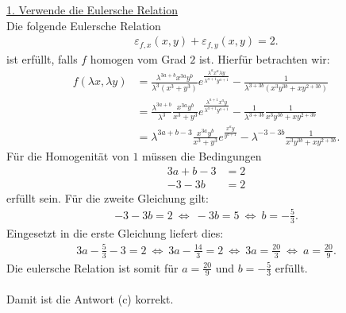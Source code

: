\underline{1. Verwende die Eulersche Relation}\\
Die folgende Eulersche Relation 
\begin{align*}
	\varepsilon_{f,x}(x,y) + \varepsilon_{f,y}(x,y) 
	= 2.
\end{align*}
ist erfüllt, falls $f$ homogen vom Grad $2$ ist. Hierfür betrachten wir:
\begin{align*}
	f(\lambda x , \lambda y)
	&=
	\frac{\lambda^{3a + b} x^{3a} y^b}{\lambda^3 (x^3 + y^3)}
	e^{\frac{\lambda^a x^a \lambda y}{\lambda^{a+1} y^{a+1}}}
	-
	\frac{1}{
		\lambda^{3 + 3b}
		(
		x^3 y^{3b} + x y^{2+ 3b}
		)
	}\\
	&= 
	\frac{\lambda^{3a + b}}{\lambda^3}
	\frac{x^{3a} y^b}{x^3 + y^3} 	e^{\frac{\lambda^{a+1} x^a  y}{\lambda^{a+1} y^{a+1}}}
	-
	\frac{1}{\lambda^{3 + 3b}}
	\frac{1}{
		x^3 y^{3b} + x y^{2+ 3b}
	}\\
	&= 
	\lambda^{3a + b -3 }
	\frac{x^{3a} y^b}{x^3 + y^3} 
	e^{\frac{ x^a  y}{ y^{a+1}}}
	-
	\lambda^{-3 - 3b}
	\frac{1}{
		x^3 y^{3b} + x y^{2+ 3b}
	}.
\end{align*}
Für die Homogenität von $1$ müssen die Bedingungen
\begin{align*}
	3a + b - 3 &= 2\\
	-3 - 3b &= 2
\end{align*}
erfüllt sein. Für die zweite Gleichung gilt:
\begin{align*}
	-3 -3 b = 2  
	\ \Leftrightarrow \
	-3 b = 5
	\ \Leftrightarrow \
	b = - \frac{5}{3}.
\end{align*}
Eingesetzt in die erste Gleichung liefert dies:
\begin{align*}
	3a - \frac{5}{3}  -3 = 2
	\ \Leftrightarrow \
	3a - \frac{14}{3}  = 2 
	\ \Leftrightarrow \
	3a = \frac{20}{3}
	\ \Leftrightarrow \
	a  = \frac{20}{9}.
\end{align*}
Die eulersche Relation ist somit für $a  = \frac{20}{9}$ und $b = - \frac{5}{3}$ erfüllt.\\
\\
Damit ist die Antwort (c) korrekt.


